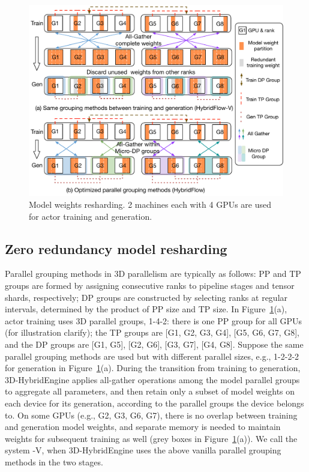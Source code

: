 \begin{figure}[t]
    \centering
    \includegraphics[width=\linewidth]{figs/fig_hybrid_comm_compare.pdf}
    \vspace{-5mm}
    \caption{Model weights resharding. 2 machines each with 4 GPUs are used for actor training and generation. %
    }
    \label{fig:comm_naive}
    \vspace{-3mm}
\end{figure}

\vspace{-1mm}
\subsection{Zero redundancy model resharding} \label{sec:hybrid_zero_redundancy}
Parallel grouping methods in 3D parallelism are typically as follows: %
PP and TP groups are formed by assigning consecutive ranks to pipeline stages and tensor shards, respectively; DP groups are constructed by selecting ranks at regular intervals, determined by the product of PP size and TP size. 
In Figure~\ref{fig:comm_naive}(a), actor training uses 3D parallel groups, 1-4-2: there is one PP group for all GPUs (for illustration clarify);
the TP groups are [G1, G2, G3, G4], [G5, G6, G7, G8], and the DP groups are [G1, G5], [G2, G6], [G3, G7], [G4, G8]. %
Suppose the same parallel grouping methods are used but with different parallel sizes, e.g., 1-2-2-2 for generation in Figure~\ref{fig:comm_naive}(a).
During the transition from training to generation, 3D-HybridEngine applies all-gather operations among the model 
parallel groups to aggregate all parameters, and then retain only a subset of model weights on each device for its generation, according to the parallel groups the device belongs to.
On some GPUs (e.g., G2, G3, G6, G7), there is no overlap between training and generation model weights, and separate memory is needed to maintain weights for subsequent training as well (grey boxes in Figure~\ref{fig:comm_naive}(a)).%
We call the system \sysname-V, when 3D-HybridEngine uses the above {vanilla} parallel grouping methods in 
{the two stages.}





